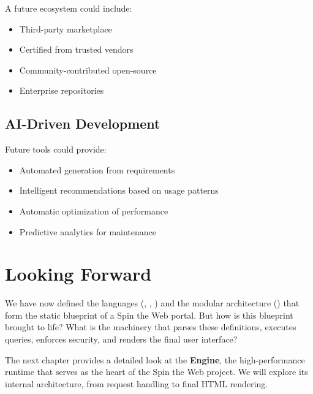 A future ecosystem could include:
\begin{itemize}
\item Third-party \webbaselet{} marketplace
\item Certified  from trusted vendors
\item Community-contributed open-source 
\item Enterprise \webbaselet{} repositories
\end{itemize}

\subsection{AI-Driven Development}

Future tools could provide:
\begin{itemize}
\item Automated \webbaselet{} generation from requirements
\item Intelligent \webbaselet{} recommendations based on usage patterns
\item Automatic optimization of \webbaselet{} performance
\item Predictive analytics for \webbaselet{} maintenance
\end{itemize}

\section{Looking Forward}
\label{sec:webbaselets-forward}

We have now defined the languages (\wbdl{}, \wbpl{}, \wbll{}) and the modular architecture () that form the static blueprint of a Spin the Web portal. But how is this blueprint brought to life? What is the machinery that parses these definitions, executes queries, enforces security, and renders the final user interface?

The next chapter provides a detailed look at the \textbf{\webspinner{} Engine}, the high-performance runtime that serves as the heart of the Spin the Web project. We will explore its internal architecture, from request handling to final HTML rendering.

